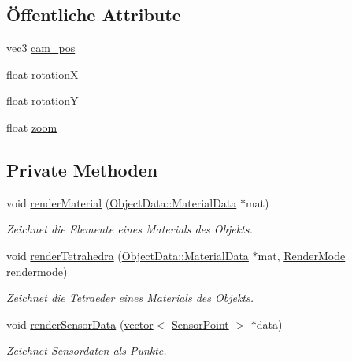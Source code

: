 \subsection*{Öffentliche Attribute}
\begin{DoxyCompactItemize}
\item 
vec3 \hyperlink{classRenderer_a05d0bc42ef41da14d0211c1eae4dd6d0}{cam\-\_\-pos}
\item 
float \hyperlink{classRenderer_addae66c8c1817bf26fe39f9afebe7388}{rotation\-X}
\item 
float \hyperlink{classRenderer_abfbff35deb804df5d19ddb2025b6b0b5}{rotation\-Y}
\item 
float \hyperlink{classRenderer_a19f3325f9fa795e3f0971d4135f22c18}{zoom}
\end{DoxyCompactItemize}
\subsection*{Private Methoden}
\begin{DoxyCompactItemize}
\item 
void \hyperlink{classRenderer_acb6c468b92221cf8a121b87a70a3da0c}{render\-Material} (\hyperlink{structObjectData_1_1MaterialData}{Object\-Data\-::\-Material\-Data} $\ast$mat)
\begin{DoxyCompactList}\small\item\em Zeichnet die Elemente eines Materials des Objekts. \end{DoxyCompactList}\item 
void \hyperlink{classRenderer_a927f376a6283de3181b86f65b927386c}{render\-Tetrahedra} (\hyperlink{structObjectData_1_1MaterialData}{Object\-Data\-::\-Material\-Data} $\ast$mat, \hyperlink{classRenderer_aa9844470f59e9fdf3aed088936100863}{Render\-Mode} rendermode)
\begin{DoxyCompactList}\small\item\em Zeichnet die Tetraeder eines Materials des Objekts. \end{DoxyCompactList}\item 
void \hyperlink{classRenderer_ad2eac0343aef1abd05ed95b1b364785f}{render\-Sensor\-Data} (\hyperlink{classstd_1_1vector}{vector}$<$ \hyperlink{structUtils_1_1SensorPoint}{Sensor\-Point} $>$ $\ast$data)
\begin{DoxyCompactList}\small\item\em Zeichnet Sensordaten als Punkte. \end{DoxyCompactList}\end{DoxyCompactItemize}
